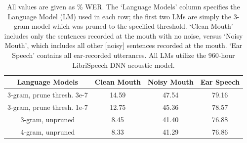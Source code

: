 \begin{table}[h]
\begin{center}
\begin{tabular}{| c || c | c | c |} \hline
Language Models & Clean Mouth & Noisy Mouth & Ear Speech \\ \hline\hline
3-gram, prune thresh. 3e-7 & 14.59 & 47.54 & 79.16 \\ \hline
3-gram, prune thresh. 1e-7 & 12.75 & 45.36 & 78.57 \\ \hline
3-gram, unpruned & 8.45 & 41.40 & 76.88 \\ \hline
4-gram, unpruned & 8.33 & 41.29 & 76.86 \\ \hline
\end{tabular}
\end{center}
\caption{All values are given as \% WER. The `Language Models' column specifies the Language Model (LM) used in each row; the first two LMs are simply the 3-gram model which was pruned to the specified threshold.  `Clean Mouth' includes only the sentences recorded at the mouth with no noise, versus `Noisy Mouth', which includes all other [noisy] sentences recorded at the mouth. `Ear Speech' contains all ear-recorded utterances.  All LMs utilize the 960-hour LibriSpeech DNN acoustic model.}\label{tab:basic-run}
\end{table}

% 



